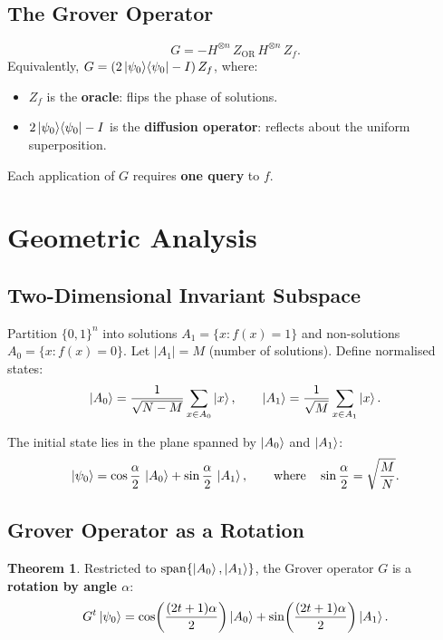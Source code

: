 \documentclass[11pt]{article}
\theoremstyle{definition}
\newtheorem{theorem}{Theorem}[section]
\begin{document}
\subsection{The Grover Operator}

\[
    G = -H^{\otimes n}\,Z_{\mathrm{OR}}\,H^{\otimes n}\,Z_f.
\]
Equivalently, $G = (2\ket{\psi_0}\!\bra{\psi_0}-I)\,Z_f$, where:
\begin{itemize}
    \item $Z_f$ is the \textbf{oracle}: flips the phase of solutions.
    \item $2\ket{\psi_0}\!\bra{\psi_0}-I$ is the \textbf{diffusion operator}: reflects about the uniform superposition.
\end{itemize}

Each application of $G$ requires \textbf{one query} to $f$.

\section{Geometric Analysis}

\subsection{Two-Dimensional Invariant Subspace}

Partition $\{0,1\}^n$ into solutions $A_1=\{x:f(x)=1\}$ and non-solutions $A_0=\{x:f(x)=0\}$.  Let $|A_1|=M$ (number of solutions).  Define normalised states:
\[
    \ket{A_0} = \frac{1}{\sqrt{N-M}}\sum_{x\in A_0}\ket{x},
    \qquad
    \ket{A_1} = \frac{1}{\sqrt{M}}\sum_{x\in A_1}\ket{x}.
\]

The initial state lies in the plane spanned by $\ket{A_0}$ and $\ket{A_1}$:
\[
    \ket{\psi_0} = \cos\frac{\alpha}{2}\,\ket{A_0}+\sin\frac{\alpha}{2}\,\ket{A_1},
    \qquad\text{where}\quad \sin\frac{\alpha}{2}=\sqrt{\frac{M}{N}}.
\]

\subsection{Grover Operator as a Rotation}

\begin{theorem}
Restricted to $\operatorname{span}\{\ket{A_0},\ket{A_1}\}$, the Grover operator $G$ is a \textbf{rotation by angle $\alpha$}:
\[
    G^t\ket{\psi_0} = \cos\!\left(\frac{(2t+1)\alpha}{2}\right)\ket{A_0}
                     +\sin\!\left(\frac{(2t+1)\alpha}{2}\right)\ket{A_1}.
\]
\end{theorem}
\end{document}
